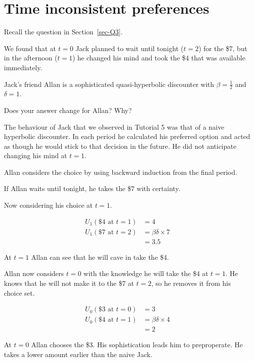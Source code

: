 \documentclass[
  letterpaper,
  DIV=11,
  numbers=noendperiod]{scrreprt}
\begin{document}
\hypertarget{time-inconsistent-preferences}{%
\section{Time inconsistent
preferences}\label{time-inconsistent-preferences}}

Recall the question in Section~\ref{sec-Q3}.

We found that at \(t=0\) Jack planned to wait until tonight (\(t=2\))
for the \$7, but in the afternoon (\(t=1\)) he changed his mind and took
the \$4 that was available immediately.

Jack's friend Allan is a sophisticated quasi-hyperbolic discounter with
\(\beta=\frac{1}{2}\) and \(\delta=1\).

Does your answer change for Allan? Why?

\begin{tcolorbox}[enhanced jigsaw, title=\textcolor{quarto-callout-tip-color}{\faLightbulb}\hspace{0.5em}{Answer}, toprule=.15mm, colback=white, breakable, titlerule=0mm, colframe=quarto-callout-tip-color-frame, coltitle=black, opacityback=0, rightrule=.15mm, colbacktitle=quarto-callout-tip-color!10!white, bottomtitle=1mm, opacitybacktitle=0.6, arc=.35mm, bottomrule=.15mm, toptitle=1mm, leftrule=.75mm, left=2mm]

The behaviour of Jack that we observed in Tutorial 5 was that of a naive
hyperbolic discounter. In each period he calculated his preferred option
and acted as though he would stick to that decision in the future. He
did not anticipate changing his mind at \(t=1\).

Allan considers the choice by using backward induction from the final
period.

If Allan waits until tonight, he takes the \$7 with certainty.

Now considering his choice at \(t=1\).

\begin{align*}
U_1(\$4\text{ at }t=1)&=4 \\
U_1(\$7\text{ at }t=2)&=\beta\delta\times 7 \\
&=3.5
\end{align*}

At \(t=1\) Allan can see that he will cave in take the \$4.

Allan now considers \(t=0\) with the knowledge he will take the \$4 at
\(t=1\). He knows that he will not make it to the \$7 at \(t=2\), so he
removes it from his choice set.

\begin{align*}
U_0(\$3\text{ at }t=0)&=3 \\
U_0(\$4\text{ at }t=1)&=\beta\delta\times 4 \\
&=2
\end{align*}

At \(t=0\) Allan chooses the \$3. His sophistication leads him to
preproperate. He takes a lower amount earlier than the naive Jack.

\end{tcolorbox}
\end{document}
